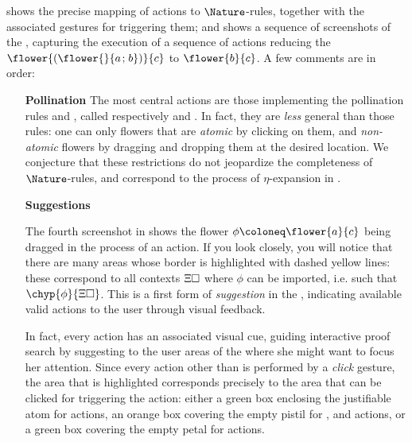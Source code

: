  shows the precise mapping of \Proof actions to
$\Nature$-rules, together with the associated gestures for triggering them; and
 shows a sequence of screenshots of the , capturing the execution of a sequence of \Proof actions reducing the
 $\flower{(\flower{}{a \sep b})}{c}$ to $\flower{b}{c}$. A few
comments are in order:

\begin{itemize}
  \item[\textbf{Pollination}] The most central actions are those implementing
  the pollination rules  and , called respectively
   and . In fact, they are \emph{less} general
  than those rules: one can only  flowers that are \emph{atomic}
  by clicking on them, and  \emph{non-atomic} flowers by dragging
  and dropping them at the desired location. We conjecture that these
  restrictions do not jeopardize the completeness of $\Nature$-rules, and
  correspond to the process of $\eta$-expansion in .
  
  \item[\textbf{Suggestions}]
  
  The fourth screenshot in  shows the flower $\phi
  \deq \flower{a}{c}$ being dragged in the process of an  action.
  If you look closely, you will notice that there are many areas whose border is
  highlighted with dashed yellow lines: these correspond to all contexts
  $\Xi\square$ where $\phi$ can be imported, i.e. such that
  $\chyp{\phi}{\Xi\hole}$. This is a first form of \emph{suggestion} in the
  , indicating available valid actions to the user through visual
  feedback.

  In fact, every \Proof action has an associated visual cue, guiding interactive
  proof search by suggesting to the user areas of the  where she might want
  to focus her attention. Since every action other than  is
  performed by a \emph{click} gesture, the area that is highlighted corresponds
  precisely to the area that can be clicked for triggering the action: either a
  green box enclosing the justifiable atom for  actions, an
  orange box covering the empty pistil for ,  and
   actions, or a green box covering the empty petal for
   actions.
  

\end{itemize}
